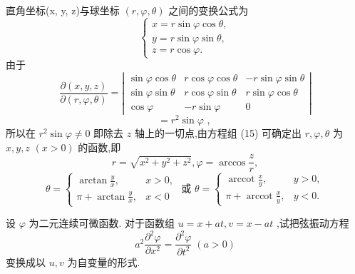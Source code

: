 \begin{example}

\end{example}
直角坐标(x, y, z)与球坐标 \(\left( {r,\varphi ,\theta }\right)\) 之间的变换公式为
\[
\left\{  \begin{array}{l} x = r\sin \varphi \cos \theta , \\  y = r\sin \varphi \sin \theta , \\  z = r\cos \varphi . \end{array}\right.  \tag{15}
\]
由于
\[
\frac{\partial \left( {x,y,z}\right) }{\partial \left( {r,\varphi ,\theta }\right) } = \left| \begin{matrix} \sin \varphi \cos \theta & r\cos \varphi \cos \theta &  - r\sin \varphi \sin \theta \\  \sin \varphi \sin \theta & r\cos \varphi \sin \theta & r\sin \varphi \cos \theta \\  \cos \varphi &  - r\sin \varphi & 0 \end{matrix}\right|
\]
\[
= {r}^{2}\sin \varphi \text{ , }
\]
所以在 \({r}^{2}\sin \varphi  \neq  0\) 即除去 \(z\) 轴上的一切点,由方程组 (15) 可确定出 \(r,\varphi ,\theta\) 为 \(x,y,z\)  \(\left( {x > 0}\right)\) 的函数,即
\[
r = \sqrt{{x}^{2} + {y}^{2} + {z}^{2}},\varphi  = \arccos \frac{z}{r},
\]
\[
\theta  = \left\{  {\begin{array}{ll} \arctan \frac{y}{x}, & x > 0, \\  \pi  + \arctan \frac{y}{x}, & x < 0 \end{array}\text{ 或 }\theta  = \left\{  \begin{array}{ll} \operatorname{arccot}\frac{x}{y}, & y > 0, \\  \pi  + \operatorname{arccot}\frac{x}{y}, & y < 0. \end{array}\right. }\right.
\]
\begin{example}

\end{example}
设 \(\varphi\) 为二元连续可微函数. 对于函数组 \(u = x + {at},v = x - {at}\) ,试把弦振动方程
\[
{a}^{2}\frac{{\partial }^{2}\varphi }{\partial {x}^{2}} = \frac{{\partial }^{2}\varphi }{\partial {t}^{2}}\;\left( {a > 0}\right)
\]
变换成以 \(u,v\) 为自变量的形式.

